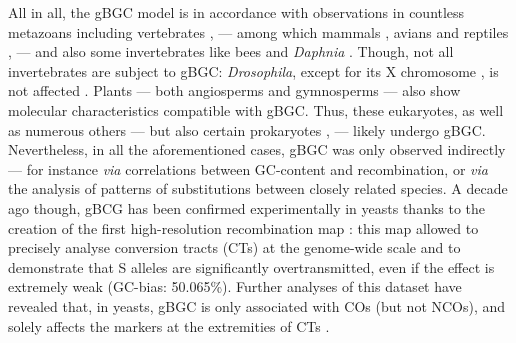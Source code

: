 All in all, the gBGC model is in accordance with observations in countless metazoans \citep{capra2011substitution,galtier2018codon} including vertebrates \citep{figuet2014biased}, — among which mammals \citep{romiguier2010contrasting,katzman2011ongoing,lartillot2013phylogenetic,clement2013meiotic,glemin2015quantification,dutta20181000}, avians \citep{webster2006strong,weber2014evidence,bolivar2016recombination} and reptiles \citep{figuet2014biased}, — and also some invertebrates like bees \citep{kent2012recombination,wallberg2015extreme} and \textit{Daphnia} \citep{keith2016high}.
Though, not all invertebrates are subject to gBGC\@: \textit{Drosophila}, except for its X chromosome \citep{galtier2006gcbiased,haddrill2008nonneutral}, is not affected \citep{robinson2014population}.
Plants — both angiosperms \citep[but see \citealp{liu2018tetrad}]{escobar2011gcbiased, glemin2014gc,rodgers-melnick2016open,clement2017evolutionary,niu2017mutational} and gymnosperms \citep{serres-giardi2012patterns} — also show molecular characteristics compatible with gBGC\@.
Thus, these eukaryotes, as well as numerous others \citep{escobar2011gcbiased,pessia2012evidence} — but also certain prokaryotes \citep{lassalle2015gccontent,long2018evolutionary}, — likely undergo gBGC\@.\\

%
%
%
%
%
%

Nevertheless, in all the aforementioned cases, gBGC was only observed indirectly — for instance \textit{via} correlations between GC-content and recombination, or \textit{via} the analysis of patterns of substitutions between closely related species. 
A decade ago though, gBCG has been confirmed experimentally in yeasts thanks to the creation of the first high-resolution recombination map \citep{mancera2008highresolution}: this map allowed to precisely analyse conversion tracts (CTs) at the genome-wide scale and to demonstrate that S alleles are significantly overtransmitted, even if the effect is extremely weak (GC-bias: 50.065\%).
Further analyses of this dataset have revealed that, in yeasts, gBGC is only associated with COs (but not NCOs), and solely affects the markers at the extremities of CTs \citep{lesecque2013gcbiased}.

